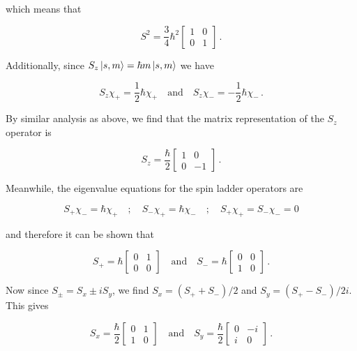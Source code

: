\documentclass[12pt, titlepage]{article}
\begin{document}
which means that

\begin{equation}
	S^2 = \frac{3}{4}\hbar^2\begin{bmatrix} 1 & 0 \\ 0 & 1\end{bmatrix} \,.
\end{equation}

Additionally, since $S_z\ket{s, m} = \hbar m \ket{s, m}$ we have

\begin{equation}
S_z\chi_+ = \frac{1}{2}\hbar\chi_+ \quad\text{and}\quad S_z\chi_- = -\frac{1}{2}\hbar\chi_- \,.
\end{equation}

By similar analysis as above, we find that the matrix representation of the $S_z$ operator is

\begin{equation}
	S_z = \frac{\hbar}{2}\begin{bmatrix}1 & 0 \\ 0 & -1\end{bmatrix} \,.
\end{equation}

Meanwhile, the eigenvalue equations for the spin ladder operators are

\begin{equation*}
	S_+\chi_- = \hbar\chi_+ \quad;\quad S_-\chi_+ = \hbar\chi_- \quad;\quad S_+\chi_+ = S_-\chi_- = 0
\end{equation*}

and therefore it can be shown that

\begin{equation}
	S_+ = \hbar\begin{bmatrix} 0 & 1 \\ 0 & 0\end{bmatrix} \quad\text{and}\quad S_- = \hbar\begin{bmatrix} 0 & 0 \\ 1 & 0\end{bmatrix} \,.
\end{equation}

Now since $S_\pm = S_x \pm iS_y$, we find $S_x = (S_+ + S_-)/2$ and $S_y = (S_+ - S_-)/2i$. This gives

\begin{equation}
	S_x = \frac{\hbar}{2}\begin{bmatrix} 0 & 1 \\ 1 & 0\end{bmatrix} \quad\text{and}\quad S_y = \frac{\hbar}{2}\begin{bmatrix} 0 & -i \\ i & 0\end{bmatrix} \,.
\end{equation}
\end{document}
